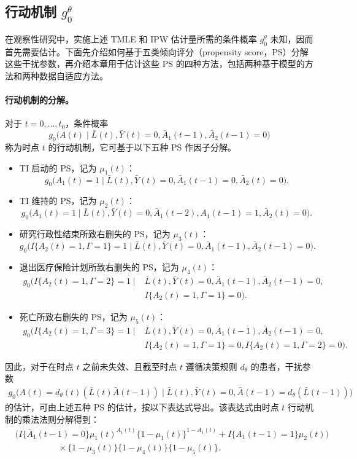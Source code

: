 \subsection{行动机制 \texorpdfstring{$g_0^\theta$}{g0θ}}

在观察性研究中，实施上述 TMLE 和 IPW 估计量所需的条件概率 $g_0^\theta$ 未知，因而首先需要估计。下面先介绍如何基于五类倾向评分（propensity score，PS）分解这些干扰参数，再介绍本章用于估计这些 PS 的四种方法，包括两种基于模型的方法和两种数据自适应方法。

\paragraph{行动机制的分解。}
对于 $t=0,\ldots,t_0$，条件概率
\[
 g_0\bigl(A(t)\mid\bar L(t),\bar Y(t)=0,\bar A_1(t-1),\bar A_2(t-1)=0\bigr)
\]
称为时点 $t$ 的行动机制，它可基于以下五种 PS 作因子分解。
\begin{itemize}
\item TI 启动的 PS，记为 $\mu_1(t)$：
\[
 g_0\bigl(A_1(t)=1\mid\bar L(t),\bar Y(t)=0,
 \bar A_1(t-1)=0,\bar A_2(t)=0\bigr).
\]
\item TI 维持的 PS，记为 $\mu_2(t)$：
\[
 g_0\bigl(A_1(t)=1\mid\bar L(t),\bar Y(t)=0,
 \bar A_1(t-2),A_1(t-1)=1,\bar A_2(t)=0\bigr).
\]
\item 研究行政性结束所致右删失的 PS，记为 $\mu_3(t)$：
\[
 g_0\bigl(I\{A_2(t)=1,\Gamma=1\}=1\mid\bar L(t),\bar Y(t)=0,
 \bar A_1(t-1),\bar A_2(t-1)=0\bigr).
\]
\item 退出医疗保险计划所致右删失的 PS，记为 $\mu_4(t)$：
\[
\begin{aligned}
 g_0\bigl(I\{A_2(t)=1,\Gamma=2\}=1\mid&\bar L(t),\bar Y(t)=0,
 \bar A_1(t-1),\bar A_2(t-1)=0,\\
 &I\{A_2(t)=1,\Gamma=1\}=0\bigr).
\end{aligned}
\]
\item 死亡所致右删失的 PS，记为 $\mu_5(t)$：
\[
\begin{aligned}
 g_0\bigl(I\{A_2(t)=1,\Gamma=3\}=1\mid&\bar L(t),\bar Y(t)=0,
 \bar A_1(t-1),\bar A_2(t-1)=0,\\
 &I\{A_2(t)=1,\Gamma=1\}=0,
 I\{A_2(t)=1,\Gamma=2\}=0\bigr).
\end{aligned}
\]
\end{itemize}
因此，对于在时点 $t$ 之前未失效、且截至时点 $t$ 遵循决策规则 $d_\theta$ 的患者，干扰参数
\[
\begin{aligned}
 g_0\bigl(A(t)=d_\theta(t)(\bar L(t)\bar A(t-1))\mid
 \bar L(t),\bar Y(t)=0,\bar A(t-1)=d_\theta(\bar L(t-1))\bigr)
\end{aligned}
\]
的估计，可由上述五种 PS 的估计，按以下表达式导出。该表达式由时点 $t$ 行动机制的乘法法则分解得到：
\[
\begin{aligned}
 &\bigl(I\{\bar A_1(t-1)=0\}\mu_1(t)^{A_1(t)}
 \{1-\mu_1(t)\}^{1-A_1(t)}
 +I\{A_1(t-1)=1\}\mu_2(t)\bigr)\\
 &\hspace{5em}\times\{1-\mu_3(t)\}\{1-\mu_4(t)\}\{1-\mu_5(t)\}.
\end{aligned}
\]

